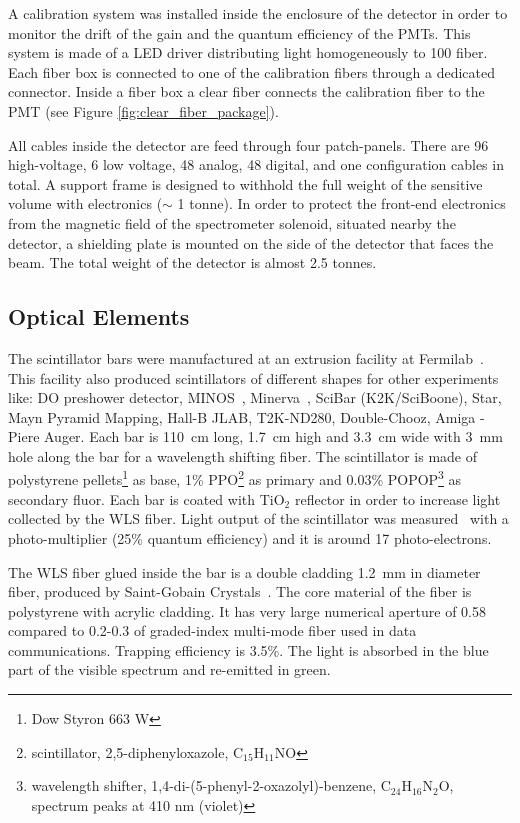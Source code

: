 \documentclass[a4paper,11pt]{article}
\begin{document}
A calibration system was installed inside the enclosure of the detector in order to monitor the drift of the gain and the quantum
efficiency of the PMTs. This system is made of a LED driver distributing light homogeneously to 100 fiber. Each fiber box is
connected to one of the calibration fibers through a dedicated connector. Inside a fiber box a clear fiber connects the calibration
fiber to the PMT (see Figure \ref{fig:clear_fiber_package}).

All cables inside the detector are feed through four patch-panels. There are 96 high-voltage, 6 low voltage, 48 analog, 48 digital,
and one configuration cables in total. A support frame is designed to withhold the full weight of the sensitive volume with electronics
($\sim$ 1 tonne). In order to protect the front-end electronics from the magnetic field of the spectrometer solenoid, situated nearby
the detector, a shielding plate is mounted on the side of the detector that faces the beam. The total weight of the detector is almost
2.5 tonnes.

\subsection{Optical Elements}
The scintillator bars were manufactured at an extrusion facility at Fermilab~\cite{PlaDalmau:2001fr}. This facility also produced
scintillators of different shapes for other experiments like: DO preshower detector, MINOS~\cite{PlaDalmau:2001en},
Minerva~\cite{PlaDalmau:2005df}, SciBar (K2K/SciBoone), Star, Mayn Pyramid Mapping, Hall-B JLAB, T2K-ND280, Double-Chooz, Amiga
- Piere Auger. Each bar is 110~cm long, 1.7~cm high and 3.3~cm wide with 3~mm hole along the bar for a wavelength shifting fiber.
The scintillator is made of polystyrene pellets\footnote{Dow Styron 663 W} as base, 1\% PPO\footnote{scintillator, 2,5-diphenyloxazole,
C$_{15}$H$_{11}$NO} as primary and 0.03\% POPOP\footnote{wavelength shifter, 1,4-di-(5-phenyl-2-oxazolyl)-benzene, C$_{24}$H$_{16}$N$_{2}$O,
spectrum peaks at 410 nm (violet)} as secondary fluor. Each bar is coated with TiO$_2$ reflector in order to increase light collected by 
the WLS fiber. Light output of the scintillator was measured~\cite{PlaDalmau:2001fr} with a photo-multiplier (25\% quantum efficiency)
and it is around 17 photo-electrons. 

The WLS fiber glued inside the bar is a double cladding 1.2~mm in diameter fiber, produced by Saint-Gobain Crystals~\cite{saintgobain}.
The core material of the fiber is polystyrene with acrylic cladding. It has very large numerical aperture of 0.58 compared to 0.2-0.3
of graded-index multi-mode fiber used in data communications. Trapping efficiency is 3.5\%. The light is absorbed in the blue part of
the visible spectrum and re-emitted in green. 
\end{document}
